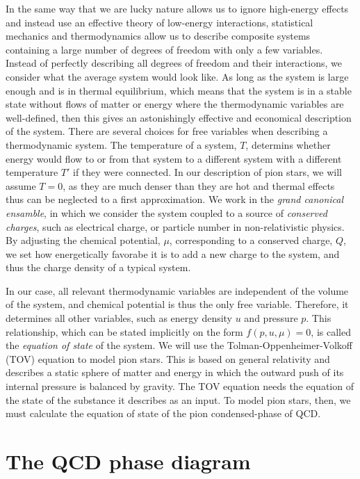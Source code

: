 In the same way that we are lucky nature allows us to ignore high-energy effects and instead use an effective theory of low-energy interactions, statistical mechanics and thermodynamics allow us to describe composite systems containing a large number of degrees of freedom with only a few variables.
Instead of perfectly describing all degrees of freedom and their interactions, we consider what the average system would look like.
As long as the system is large enough and is in thermal equilibrium, which means that the system is in a stable state without flows of matter or energy where the thermodynamic variables are well-defined, then this gives an astonishingly effective and economical description of the system.
There are several choices for free variables when describing a thermodynamic system.
The temperature of a system, $T$, determins whether energy would flow to or from that system to a different system with a different temperature $T'$ if they were connected.
In our description of pion stars, we will assume $T = 0$, as they are much denser than they are hot and thermal effects thus can be neglected to a first approximation.
We work in the \emph{grand canonical ensamble}, in which we consider the system coupled to a source of \emph{conserved charges}, such as electrical charge, or particle number in non-relativistic physics.
By adjusting the chemical potential, $\mu$, corresponding to a conserved charge, $Q$, we set how energetically favorabe it is to add a new charge to the system, and thus the charge density of a typical system.

In our case, all relevant thermodynamic variables are independent of the volume of the system, and chemical potential is thus the only free variable.
Therefore, it determines all other variables, such as energy density $u$ and pressure $p$.
This relationship, which can be stated implicitly on the form $f(p, u, \mu) = 0$, is called the \emph{equation of state} of the system.
We will use the Tolman-Oppenheimer-Volkoff (TOV) equation to model pion stars.
This is based on general relativity and describes a static sphere of matter and energy in which the outward push of its internal pressure is balanced by gravity.
The TOV equation needs the equation of the state of the substance it describes as an input.
To model pion stars, then, we must calculate the equation of state of the pion condensed-phase of QCD.



\section{The QCD phase diagram}

